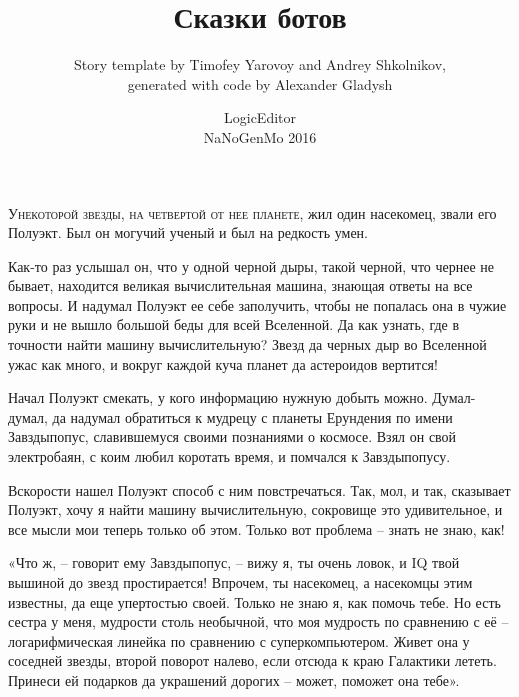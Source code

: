 \documentclass[ebook,oneside,final,openright]{memoir}
\begin{document}
\frontmatter
{}
\title{\Huge{Сказки ботов}}
\author{
  Story template by Timofey Yarovoy and Andrey Shkolnikov,\\
  generated with code by Alexander Gladysh
}
\date{LogicEditor\\NaNoGenMo 2016}

\maketitle

\mainmatter
\chapter{}
 \lettrine{У}{некоторой звезды, на четвертой от нее планете,} жил один насекомец, звали его Полуэкт. Был он могучий ученый и был на редкость умен.\par
\par
Как-то раз услышал он, что у одной черной дыры, такой черной, что чернее не бывает, находится великая вычислительная машина, знающая ответы на все вопросы. И надумал Полуэкт ее себе заполучить, чтобы не попалась она в чужие руки и не вышло большой беды для всей Вселенной. Да как узнать, где в точности найти машину вычислительную? Звезд да черных дыр во Вселенной ужас как много, и вокруг каждой куча планет да астероидов вертится!\par
\par
Начал Полуэкт смекать, у кого информацию нужную добыть можно. Думал-думал, да надумал обратиться к мудрецу с планеты Ерундения по имени Завздыпопус, славившемуся своими познаниями о космосе. Взял он свой электробаян, с коим любил коротать время, и помчался к Завздыпопусу.\par
\par
Вскорости нашел Полуэкт способ с ним повстречаться. Так, мол, и так, сказывает Полуэкт, хочу я найти машину вычислительную, сокровище это удивительное, и все мысли мои теперь только об этом. Только вот проблема – знать не знаю, как!\par
\par
«Что ж, – говорит ему Завздыпопус, – вижу я, ты очень ловок, и IQ твой вышиной до звезд простирается! Впрочем, ты насекомец, а насекомцы этим известны, да еще упертостью своей. Только не знаю я, как помочь тебе. Но есть сестра у меня, мудрости столь необычной, что моя мудрость по сравнению с её – логарифмическая линейка по сравнению с суперкомпьютером. Живет она у соседней звезды, второй поворот налево, если отсюда к краю Галактики лететь. Принеси ей подарков да украшений дорогих – может, поможет она тебе».\par
\end{document}
